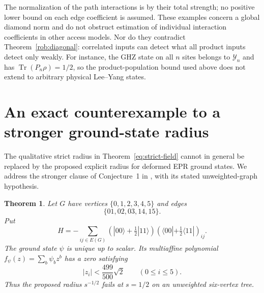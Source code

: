 \documentclass[reqno]{amsart}
\newtheorem{theorem}{Theorem}[section]
\theoremstyle{definition}
\theoremstyle{remark}
\DeclareMathOperator{\Tr}{Tr}
\begin{document}
The normalization of the path interactions is by their total strength;
no positive lower bound on each edge coefficient is assumed.  These
examples concern a global diamond norm and do not obstruct estimation
of individual interaction coefficients in other access models.
Nor do they contradict Theorem~\ref{rob:diagonal}: correlated inputs
can detect what all product inputs detect only weakly.  For instance,
the GHZ state on all $n$ sites belongs to $\mathcal Y_n$ and has
$\Tr(P_n\rho)=1/2$, so the product-population bound used above does not
extend to arbitrary physical Lee--Yang states.


\section{An exact counterexample to a stronger ground-state radius}\label{cx:section}

The qualitative strict radius in Theorem~\ref{eq:strict-field} cannot
in general be replaced by the proposed explicit radius for deformed
EPR ground states. We address the stronger clause of Conjecture~1 in
\cite[Section 5.4]{WBG26}, with its stated unweighted-graph hypothesis.

\begin{theorem}\label{cx:epr}
Let $G$ have vertices $\{0,1,2,3,4,5\}$ and edges
\[
 \{01,02,03,14,15\}.
\]
Put
\[
 H=-\sum_{ij\in E(G)}
 (|00\rangle+\tfrac12|11\rangle)
 (\langle00|+\tfrac12\langle11|)_{ij}.
\]
The ground state $\psi$ is unique up to scalar. Its multiaffine
polynomial $f_\psi(z)=\sum_b\psi_bz^b$ has a zero satisfying
\[
 |z_i|<\frac{499}{500}\sqrt2\qquad(0\leq i\leq5).
\]
Thus the proposed radius $s^{-1/2}$ fails at $s=1/2$ on an
unweighted six-vertex tree.
\end{theorem}
\end{document}
